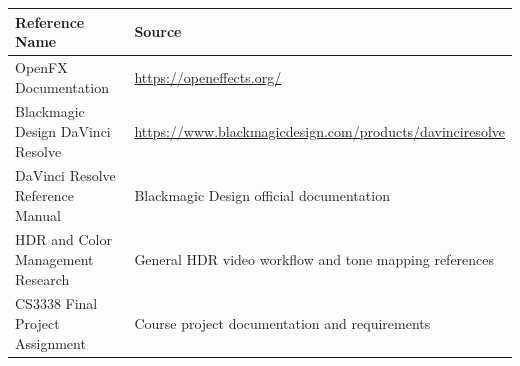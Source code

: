 \documentclass[12pt,hyphens]{article}
\begin{document}
\begin{table}[H]
\centering
\renewcommand{\arraystretch}{1.6}
\begin{tabular}{|p{5cm}|>{\raggedright\arraybackslash}p{9cm}|}
\hline
\textbf{Reference Name} & \textbf{Source} \\
\hline
OpenFX Documentation & \url{https://openeffects.org/} \\
\hline
Blackmagic Design DaVinci Resolve & \url{https://www.blackmagicdesign.com/products/davinciresolve} \\
\hline
DaVinci Resolve Reference Manual & Blackmagic Design official documentation \\
\hline
HDR and Color Management Research & General HDR video workflow and tone mapping references \\
\hline
CS3338 Final Project Assignment & Course project documentation and requirements \\
\hline
\end{tabular}
\end{table}

\end{document}
